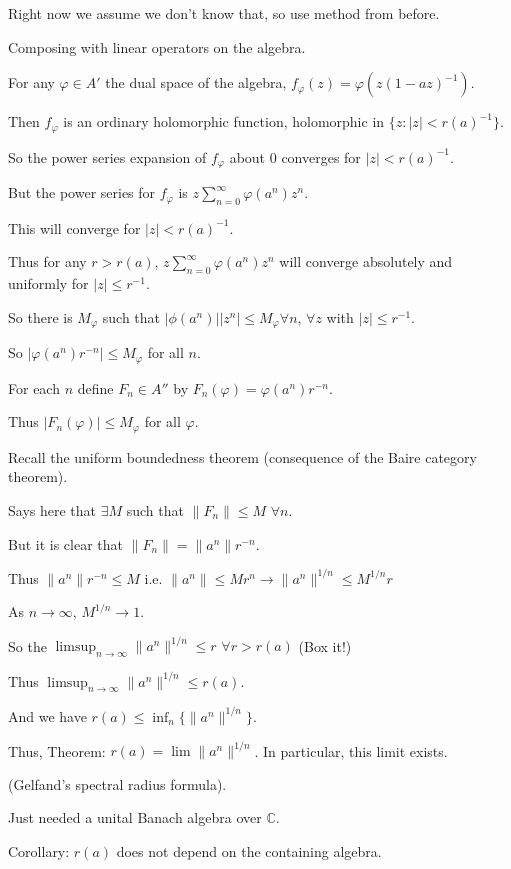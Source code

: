 \documentclass[12pt]{article}
\newcommand{\inv}{^{-1}}
\begin{document}
Right now we assume we don't know that, so use method from before.

Composing with linear operators on the algebra.

For any $\varphi \in A'$ the dual space of the algebra, $f_\varphi(z) = \varphi(z(1 - az)\inv)$.

Then $f_\varphi$ is an ordinary holomorphic function, holomorphic in $\{z: |z| < r(a)\inv\}$.

So the power series expansion of $f_\varphi$ about 0 converges for $|z| < r(a)\inv$.

But the power series for $f_\varphi$ is $z\sum_{n = 0}^\infty \varphi(a^n)z^n$.

This will converge for $|z| < r(a)\inv$.

Thus for any $r > r(a)$, $z\sum_{n = 0}^\infty \varphi(a^n)z^n$ will converge absolutely and uniformly for $|z| \leq r\inv$.

So there is $M_\varphi$ such that $|\phi(a^n)||z^n| \leq M_\varphi \forall n$, $\forall z$ with $|z| \leq r\inv$.

So $|\varphi(a^n)r^{-n}| \leq M_\varphi$ for all $n$.

For each $n$ define $F_n \in A''$ by $F_n(\varphi) = \varphi(a^n)r^{-n}$.

Thus $|F_n(\varphi)| \leq M_\varphi$ for all $\varphi$.

Recall the uniform boundedness theorem (consequence of the Baire category theorem).

Says here that $\exists M$ such that $\|F_n\| \leq M$ $\forall n$.

But it is clear that $\|F_n\| = \|a^n\|r^{-n}$.

Thus $\|a^n\|r^{-n} \leq M$ i.e. $\|a^n\| \leq Mr^n \to \|a^n\|^{1/n} \leq M^{1/n}r$

As $n \to \infty$, $M^{1/n} \to 1$.

So the $\limsup_{n \to \infty} \|a^n\|^{1/n} \leq r$ $\forall r > r(a)$ (Box it!)

Thus $\limsup_{n \to \infty}\|a^n\|^{1/n} \leq r(a)$.

And we have $r(a) \leq \inf_n\{\|a^n\|^{1/n}\}$.

\noindent
Thus, Theorem: $r(a) = \lim\|a^n\|^{1/n}$.  In particular, this limit exists.

(Gelfand's spectral radius formula).

Just needed a unital Banach algebra over $\mathds{C}$.

\noindent
Corollary: $r(a)$ does not depend on the containing algebra.\\
\end{document}
